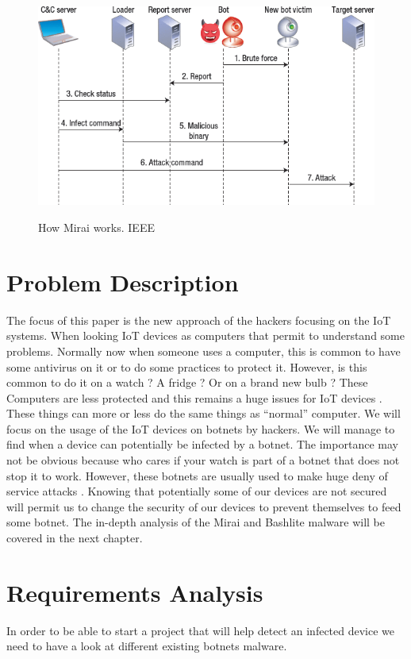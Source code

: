 \documentclass{report}
\begin{document}
\newpage
\begin{figure}[h]
 \caption{How Mirai works. IEEE \protect\footnotemark}
 \centering
 \includegraphics[width=1.2\textwidth]{./img/botnet-fonct}
 \label{fig:botnet-fonct}
\end{figure}


\chapter{Problem Description}
The focus of this paper is the new approach of the hackers focusing on the IoT systems. When looking IoT devices as computers that permit to understand some problems. Normally now when someone uses a computer, this is common to have some antivirus on it or to do some practices to protect it. However, is this common to do it on a watch ? A fridge ? Or on a brand new bulb ? These Computers are less protected and this remains a huge issues for IoT devices \autocite{yang2017survey}. These things can more or less do the same things as ``normal'' computer. We will focus on the usage of the IoT devices on botnets by hackers. We will manage to find when a device can potentially be infected by a botnet. The importance may not be obvious because who cares if your watch is part of a botnet that does not stop it to work. However, these botnets are usually used to make huge deny of service attacks \autocite{hallman2017ioddos}. Knowing that potentially some of our devices are not secured will permit us to change the security of our devices to prevent themselves to feed some botnet.\newline
The in-depth analysis of the Mirai and Bashlite malware will be covered in the next chapter.

\chapter{Requirements Analysis}
In order to be able to start a project that will help detect an infected device we need to have a look at different existing botnets malware.
\end{document}
